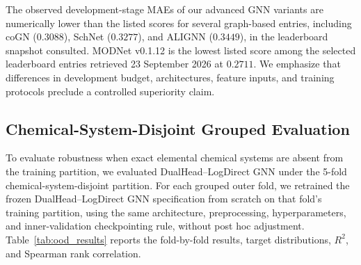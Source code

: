 \documentclass[journal,article,submit,moreauthors,pdftex]{article}
\begin{document}
The observed development-stage MAEs of our advanced GNN variants are numerically lower than the listed scores for several graph-based entries, including coGN ($0.3088$), SchNet ($0.3277$), and ALIGNN ($0.3449$), in the leaderboard snapshot consulted. MODNet v0.1.12 is the lowest listed score among the selected leaderboard entries retrieved 23 September 2026 at $0.2711$. We emphasize that differences in development budget, architectures, feature inputs, and training protocols preclude a controlled superiority claim.

\subsection{Chemical-System-Disjoint Grouped Evaluation}
To evaluate robustness when exact elemental chemical systems are absent from the training partition, we evaluated DualHead--LogDirect GNN under the 5-fold chemical-system-disjoint partition. For each grouped outer fold, we retrained the frozen DualHead--LogDirect GNN specification from scratch on that fold's training partition, using the same architecture, preprocessing, hyperparameters, and inner-validation checkpointing rule, without post hoc adjustment. Table~\ref{tab:ood_results} reports the fold-by-fold results, target distributions, $R^2$, and Spearman rank correlation.
\end{document}

